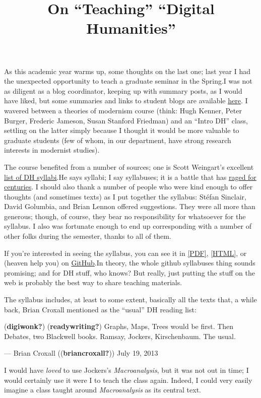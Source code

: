 \documentclass[
  12pt,
]{article}
\title{On ``Teaching'' ``Digital Humanities''}
\author{}
\date{}
\begin{document}
As this academic year warms up, some thoughts on the last one; last year
I had the unexpected opportunity to teach a graduate seminar in the
Spring.{I was not as diligent as a blog coordinator, keeping up with
summary posts, as I would have liked, but some summaries and links to
student blogs are available \href{http://630dh.cforster.com/}{here}.} I
wavered between a theories of modernism course (think: Hugh Kenner,
Peter Burger, Frederic Jameson, Susan Stanford Friedman) and an ``Intro
DH'' class, settling on the latter simply because I thought it would be
more valuable to graduate students (few of whom, in our department, have
strong research interests in modernist studies).

The course benefited from a number of sources; one is Scott Weingart's
excellent \href{http://www.scottbot.net/HIAL/?page_id=21794}{list of DH
syllabi}.{He says syllabi; I say syllabuses; it is a battle that has
\href{http://books.google.com/ngrams/graph?content=syllabi\%2Csyllabuses\&year_start=1800\&year_end=2000\&corpus=15\&smoothing=3\&share=}{raged
for centuries}.} I should also thank a number of people who were kind
enough to offer thoughts (and sometimes texts) as I put together the
syllabus: Stéfan Sinclair, David Golumbia, and Brian Lennon offered
suggestions. They were all more than generous; though, of course, they
bear no responsibility for whatsoever for the syllabus. I also was
fortunate enough to end up corresponding with a number of other folks
during the semester, thanks to all of them.

If you're interested in seeing the syllabus, you can see it in
\href{/files/eng630_syllabus-final.pdf}{{[}PDF{]}},
\href{/files/eng630_syllabus-final.html}{{[}HTML{]}}, or (heaven help
you) on \href{https://github.com/c-forster/eng630-syllabus}{GitHub}.{In
theory, the whole github syllabuses thing sounds promising; and for DH
stuff, who knows? But really, just putting the stuff on the web is
probably the best way to share teaching materials.}

The syllabus includes, at least to some extent, basically all the texts
that, a while back, Brian Croxall mentioned as the ``usual'' DH reading
list:

(\textbf{digiwonk?}) (\textbf{readywriting?}) Graphs, Maps, Trees would
be first. Then Debates, two Blackwell books. Ramsay, Jockers,
Kirschenbaum. The usual.

--- Brian Croxall ((\textbf{briancroxall?})) July 19, 2013

I would have \emph{loved} to use Jockers's \emph{Macroanalysis}, but it
was not out in time; I would certainly use it were I to teach the class
again. Indeed, I could very easily imagine a class taught around
\emph{Macroanalysis} as its central text.
\end{document}
